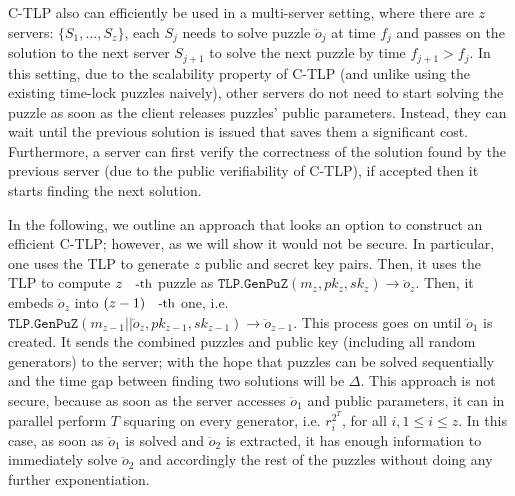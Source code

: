 \begin{remark}
C-TLP also can efficiently  be used in a multi-server setting,  where there are $z$ servers: $\{S_{\scriptscriptstyle 1},...,S_{\scriptscriptstyle z}\}$,  each $S_{\scriptscriptstyle j}$ needs to solve puzzle $\ddot{o}_{\scriptscriptstyle j}$ at time $f_{\scriptscriptstyle j}$ and passes on the solution to the next server $S_{\scriptscriptstyle j+1}$ to solve the next puzzle by time $f_{\scriptscriptstyle j+1}>f_{\scriptscriptstyle j}$. In this setting,  due to the scalability property of C-TLP (and unlike using the existing time-lock puzzles naively), other servers do not need to start solving the puzzle   as soon as the client releases puzzles' public parameters. Instead, they can wait until the previous solution is issued that saves them a significant cost. Furthermore, a  server can first  verify the correctness  of the solution found by the previous server (due to the public verifiability of C-TLP),  if accepted then   it starts finding the next solution. 
\end{remark}


\begin{remark}
In the following, we outline an  approach that looks an option to construct an efficient C-TLP; however, as we will show it would not be secure. In particular,  one uses the TLP to generate $z$ public and secret key pairs. Then, it uses the TLP to compute $z\text{\small{-th}}$ puzzle as $\mathtt{TLP.GenPuZ}(m_{\scriptscriptstyle z},pk_{\scriptscriptstyle z},sk_{\scriptscriptstyle z})\rightarrow \ddot{o}_{\scriptscriptstyle z}$.  Then, it embeds $\ddot{o}_{\scriptscriptstyle z}$ into $(z-1)\text{\small{-th}}$ one, i.e. $\mathtt{TLP.GenPuZ}(m_{\scriptscriptstyle z-1}||\ddot{o}_{\scriptscriptstyle z},pk_{\scriptscriptstyle z-1},sk_{\scriptscriptstyle z-1})\rightarrow \ddot{o}_{\scriptscriptstyle z-1}$. This process goes on until $\ddot{o}_{\scriptscriptstyle 1}$  is created. It sends the combined puzzles and public key (including all random generators) to the server; with the hope that puzzles can be solved sequentially and the time gap between finding two solutions will be $\Delta$.  This approach is not secure, because as soon as the server accesses $\ddot{o}_{\scriptscriptstyle 1}$ and public parameters, it can in parallel perform $T$ squaring on every generator, i.e. $r^{\scriptscriptstyle 2^{\scriptscriptstyle T}}_{\scriptscriptstyle i}$, for all $i, 1\leq i\leq z$. In this case, as soon as $\ddot{o}_{\scriptscriptstyle 1}$ is solved and  $\ddot{o}_{\scriptscriptstyle 2}$  is extracted, it has enough information to  immediately solve $\ddot{o}_{\scriptscriptstyle 2}$ and accordingly the rest of the puzzles without doing any further exponentiation. 
\end{remark}
